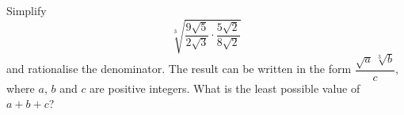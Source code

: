 Simplify
\[\sqrt[3]{\dfrac{9\sqrt5}{2\sqrt3}\cdot\dfrac{5\sqrt2}{8\sqrt2}}\]
and rationalise the denominator. The result can be written in the form $\dfrac{\sqrt a\,\sqrt[3]b}{c}$, where $a$, $b$ and $c$ are positive integers. What is the least possible value of $a+b+c$?
